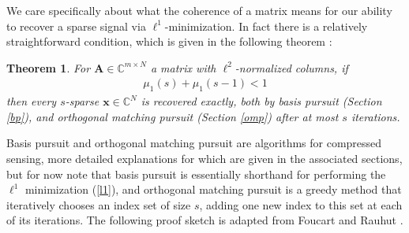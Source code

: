 \documentclass[12pt,a4paper]{amsart}
\numberwithin{equation}{section}
\theoremstyle{plain}
\newtheorem{Th}{Theorem}[section]
\theoremstyle{definition}
\newcommand{\BC}{\mathbb C}
\newcommand{\bdx}{\mathbf{x}}
\newcommand{\bdA}{\mathbf{A}}
\begin{document}
We care specifically about what the coherence of a matrix means for our ability to recover a sparse signal via $\ell^1$-minimization. In fact there is a relatively straightforward condition, which is given in the following theorem \cite{fou-rau}:

\begin{Th}\label{coh-thm} For $\bdA\in\BC^{m\times N}$ a matrix with $\ell^2$-normalized columns, if \begin{align}\mu_1(s)+\mu_1(s-1)<1\end{align} then every $s$-sparse $\bdx\in\BC^N$ is recovered exactly, both by basis pursuit (Section \ref{bp}), and orthogonal matching pursuit (Section \ref{omp}) after at most $s$ iterations.
\end{Th}

Basis pursuit and orthogonal matching pursuit are algorithms for compressed sensing, more detailed explanations for which are given in the associated sections, but for now note that basis pursuit is essentially shorthand for performing the $\ell^1$ minimization (\ref{l1}), and orthogonal matching pursuit is a greedy method that iteratively chooses an index set of size $s$, adding one new index to this set at each of its iterations. The following proof sketch is adapted from Foucart and Rauhut \cite{fou-rau}.
\end{document}
